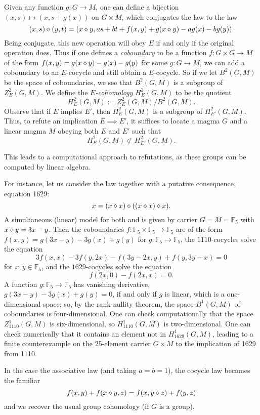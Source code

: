 Given any function $g: G \to M$, one can define a bijection $(x,s) \mapsto (x,s+g(x))$ on $G \times M$, which conjugates the law  to the law
$$ (x,s) \diamond (y,t) = (x \diamond y, as + bt + f(x,y) + g(x \diamond y) - ag(x) - bg(y)).$$
Being conjugate, this new operation will obey $E$ if and only if the original operation does.
Thus if one defines a \emph{coboundary} to be a function $f: G \times G \to M$ of the form $f(x,y) =g(x \diamond y) - g(x) - g(y)$ for some $g: G \to M$, we can add a coboundary to an $E$-cocycle and still obtain a $E$-cocycle.  So if we let $B^2(G,M)$ be the space of coboundaries, we see that $B^2(G,M)$ is a subgroup of $Z^2_E(G,M)$.  We define the \emph{$E$-cohomology} $H^2_E(G,M)$ to be the quotient
$$ H^2_E(G,M) := Z^2_E(G,M) / B^2(G,M).$$
Observe that if $E$ implies $E'$, then $H^2_E(G,M)$ is a subgroup of $H^2_{E'}(G,M)$.  Thus, to refute an implication $E \implies E'$, it suffices to locate a magma $G$ and a linear magma $M$ obeying both $E$ and $E'$ such that
\begin{equation}\label{hgm}
  H^2_E(G,M) \not\subset H^2_{E'}(G,M).
\end{equation}

This leads to a computational approach to refutations, as these groups can be computed by linear algebra.

For instance, let us consider the law  together with a putative consequence, equation 1629:
\begin{equation}\label{1629}
  x = (x \diamond x) \diamond ((x \diamond x) \diamond x).
\end{equation}
A simultaneous (linear) model for both  and  is given by carrier $G=M={\mathbb F}_5$ with $x \diamond y = 3x-y$.  Then the coboundaries $f: {\mathbb F}_5 \times {\mathbb F}_5 \to {\mathbb F}_5$ are of the form $f(x,y) = g(3x-y) - 3g(x) + g(y)$ for $g: {\mathbb F}_5 \to {\mathbb F}_5$, the $1110$-cocycles solve the equation
$$3 f(x,x) - 3 f(y, 2x) - f(3y - 2x, y) + f( y, 3y - x) = 0$$
for $x,y \in {\mathbb F}_5$, and the $1629$-cocycles solve the equation
$$ f(2x,0) - f(2x,x) = 0.$$
A function $g:{\mathbb F}_5 \to {\mathbb F}_5$ has vanishing derivative, $g(3x-y) - 3g(x) + g(y) = 0$, if and only if $g$ is linear, which is a one-dimensional space; so, by the rank-nullity theorem, the space $B^1(G,M)$ of coboundaries is four-dimensional.  One can check computationally that the space $Z^1_{1110}(G,M)$ is six-dimensional, so $H^1_{1110}(G,M)$ is two-dimensional.  One can check numerically that it contains an element not in $H^1_{1629}(G,M)$, leading to a finite counterexample on the 25-element carrier $G \times M$ to the implication of 1629 from 1110.

\begin{remark} In the case the associative law (and taking $a=b=1$), the cocycle law becomes the familiar
  $$ f(x,y) + f(x \diamond y, z) = f(x, y \diamond z) + f(y,z)$$
and we recover the usual group cohomology (if $G$ is a group).
\end{remark}
